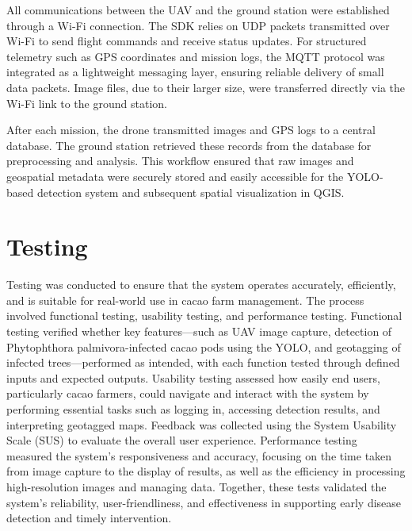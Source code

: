 	All communications between the UAV and the ground station were established through a 
	Wi-Fi connection. The SDK relies on UDP packets transmitted over Wi-Fi to send 
	flight commands and receive status updates. For structured telemetry such as GPS coordinates 
	and mission logs, the MQTT protocol was integrated as a lightweight messaging layer, 
	ensuring reliable delivery of small data packets. Image files, due to their larger size, were 
	transferred directly via the Wi-Fi link to the ground station.  
	
	After each mission, the drone transmitted images and GPS logs to a central database. 
	The ground station retrieved these records from the database for preprocessing 
	and analysis. This workflow ensured that raw images and geospatial metadata were securely 
	stored and easily accessible for the YOLO-based detection system and subsequent 
	spatial visualization in QGIS.
	
	\section{Testing} 
	Testing was conducted to ensure that the system operates accurately, efficiently, and is suitable for real-world use in cacao farm management. The process involved functional testing, usability testing, and performance testing. Functional testing verified whether key features—such as UAV image capture, detection of Phytophthora palmivora-infected cacao pods using the YOLO, and geotagging of infected trees—performed as intended, with each function tested through defined inputs and expected outputs. Usability testing assessed how easily end users, particularly cacao farmers, could navigate and interact with the system by performing essential tasks such as logging in, accessing detection results, and interpreting geotagged maps. Feedback was collected using the System Usability Scale (SUS) to evaluate the overall user experience. Performance testing measured the system’s responsiveness and accuracy, focusing on the time taken from image capture to the display of results, as well as the efficiency in processing high-resolution images and managing data. Together, these tests validated the system’s reliability, user-friendliness, and effectiveness in supporting early disease detection and timely intervention.
	
